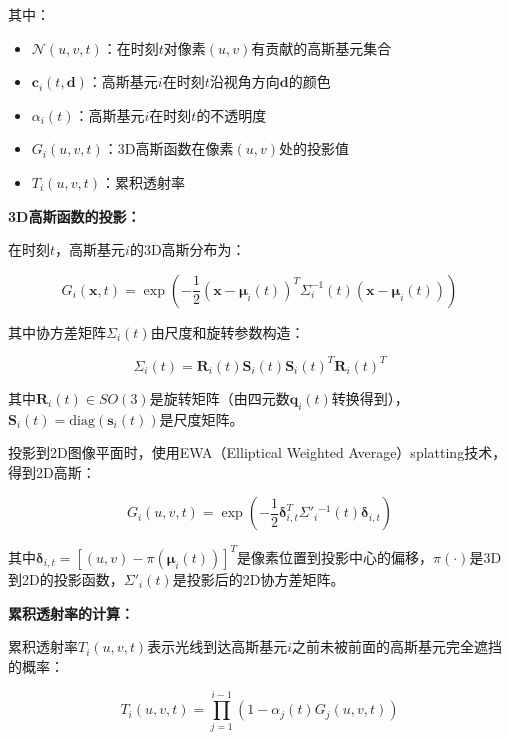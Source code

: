 其中：
\begin{itemize}
\item $\mathcal{N}(u,v,t)$：在时刻$t$对像素$(u,v)$有贡献的高斯基元集合
\item $\mathbf{c}_i(t, \mathbf{d})$：高斯基元$i$在时刻$t$沿视角方向$\mathbf{d}$的颜色
\item $\alpha_i(t)$：高斯基元$i$在时刻$t$的不透明度
\item $G_i(u,v,t)$：3D高斯函数在像素$(u,v)$处的投影值
\item $T_i(u,v,t)$：累积透射率
\end{itemize}

\textbf{3D高斯函数的投影：}

在时刻$t$，高斯基元$i$的3D高斯分布为：

\begin{equation}
G_i(\mathbf{x}, t) = \exp\left(-\frac{1}{2}(\mathbf{x} - \boldsymbol{\mu}_i(t))^T \Sigma_i^{-1}(t) (\mathbf{x} - \boldsymbol{\mu}_i(t))\right)
\label{eq:3d_gaussian}
\end{equation}

其中协方差矩阵$\Sigma_i(t)$由尺度和旋转参数构造：

\begin{equation}
\Sigma_i(t) = \mathbf{R}_i(t) \mathbf{S}_i(t) \mathbf{S}_i(t)^T \mathbf{R}_i(t)^T
\label{eq:covariance_matrix}
\end{equation}

其中$\mathbf{R}_i(t) \in SO(3)$是旋转矩阵（由四元数$\mathbf{q}_i(t)$转换得到），$\mathbf{S}_i(t) = \text{diag}(\mathbf{s}_i(t))$是尺度矩阵。

投影到2D图像平面时，使用EWA（Elliptical Weighted Average）splatting技术，得到2D高斯：

\begin{equation}
G_i(u,v,t) = \exp\left(-\frac{1}{2}\boldsymbol{\delta}_{i,t}^T \Sigma'_i{}^{-1}(t) \boldsymbol{\delta}_{i,t}\right)
\label{eq:2d_gaussian_projection}
\end{equation}

其中$\boldsymbol{\delta}_{i,t} = [(u,v) - \pi(\boldsymbol{\mu}_i(t))]^T$是像素位置到投影中心的偏移，$\pi(\cdot)$是3D到2D的投影函数，$\Sigma'_i(t)$是投影后的2D协方差矩阵。

\textbf{累积透射率的计算：}

累积透射率$T_i(u,v,t)$表示光线到达高斯基元$i$之前未被前面的高斯基元完全遮挡的概率：

\begin{equation}
T_i(u,v,t) = \prod_{j=1}^{i-1} (1 - \alpha_j(t) G_j(u,v,t))
\label{eq:transmittance}
\end{equation}

